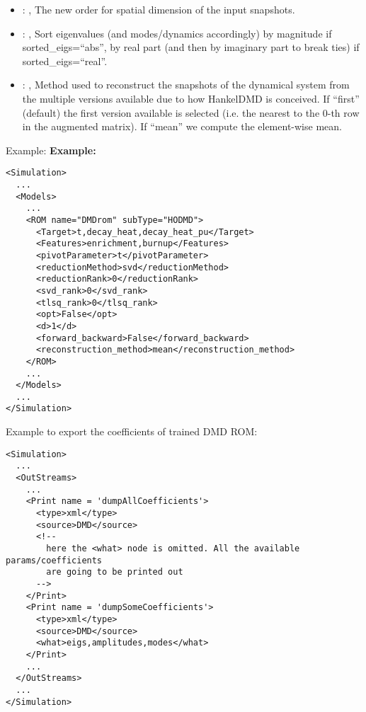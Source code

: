 \begin{itemize}
    \item {}: , 
      The new order for spatial dimension of the input snapshots.

    \item {}: , 
      Sort eigenvalues (and modes/dynamics accordingly) by magnitude if sorted\_eigs=``abs'',
      by real part (and then by imaginary part to break ties) if sorted\_eigs=``real''.

    \item {}: , 
      Method used to reconstruct the snapshots of the dynamical system from the multiple versions
      available                                                  due to how HankelDMD is conceived.
      If ``first'' (default) the first version available is selected
      (i.e. the nearest to the 0-th row in the augmented matrix). If ``mean'' we compute the
      element-wise mean.
  \end{itemize}

\hspace{24pt}
Example:
\textbf{Example:}
\begin{lstlisting}[style=XML,morekeywords={name,subType}]
<Simulation>
  ...
  <Models>
    ...
    <ROM name="DMDrom" subType="HODMD">
      <Target>t,decay_heat,decay_heat_pu</Target>
      <Features>enrichment,burnup</Features>
      <pivotParameter>t</pivotParameter>
      <reductionMethod>svd</reductionMethod>
      <reductionRank>0</reductionRank>
      <svd_rank>0</svd_rank>
      <tlsq_rank>0</tlsq_rank>
      <opt>False</opt>
      <d>1</d>
      <forward_backward>False</forward_backward>
      <reconstruction_method>mean</reconstruction_method>
    </ROM>
    ...
  </Models>
  ...
</Simulation>
\end{lstlisting}

Example to export the coefficients of trained DMD ROM:
\begin{lstlisting}[style=XML,morekeywords={name,subType}]
<Simulation>
  ...
  <OutStreams>
    ...
    <Print name = 'dumpAllCoefficients'>
      <type>xml</type>
      <source>DMD</source>
      <!--
        here the <what> node is omitted. All the available params/coefficients
        are going to be printed out
      -->
    </Print>
    <Print name = 'dumpSomeCoefficients'>
      <type>xml</type>
      <source>DMD</source>
      <what>eigs,amplitudes,modes</what>
    </Print>
    ...
  </OutStreams>
  ...
</Simulation>
\end{lstlisting}


